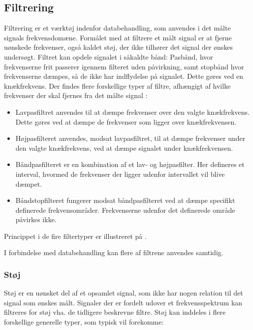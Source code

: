 \subsection{Filtrering}
Filtrering er et værktøj indenfor databehandling, som anvendes i det målte signals frekvensdomæne. Formålet med at filtrere et målt signal er at fjerne uønskede frekvenser, også kaldet støj, der ikke tilhører det signal der ønskes undersøgt. Filtret kan opdele signalet i såkaldte bånd: Pasbånd, hvor frekvenserne frit passerer igennem filteret uden påvirkning, samt stopbånd hvor frekvenserne dæmpes, så de ikke har indflydelse på signalet. Dette gøres ved en knækfrekvens.
Der findes flere forskellige typer af filtre, afhængigt af hvilke frekvenser der skal fjernes fra det målte signal \cite{Devasahayam2000}:

\begin{itemize}
	\item Lavpasfiltret anvendes til at dæmpe frekvenser over den valgte knækfrekvens. Dette gøres ved at dæmpe de frekvenser som ligger over knækfrekvensen.
	\item Højpasfilteret anvendes, modsat lavpasfiltret, til at dæmpe frekvenser under den valgte knækfrekvens, ved at dæmpe signalet under knækfrekvensen.
	\item Båndpasfilteret er en kombination af et lav- og højpasfilter.  Her defineres et interval, hvormed de frekvenser der ligger udenfor intervallet vil blive dæmpet.
	\item Båndstopfilteret fungerer modsat båndpasfilteret ved at dæmpe specifikt definerede frekvensområder. Frekvenserne udenfor det definerede område påvirkes ikke. 
\end{itemize}
  
Princippet i de fire filtertyper er illustreret på .

I forbindelse med databehandling kan flere af filtrene anvendes samtidig. \cite{Devasahayam2000}

\subsubsection{Støj}
Støj er en uønsket del af et opsamlet signal, som ikke har nogen relation til det signal som ønskes målt. Signaler der er fordelt udover et frekvensspektrum kan filtreres for støj vha. de tidligere beskrevne filtre. \cite{Devasahayam2000}
Støj kan inddeles i flere forskellige generelle typer, som typisk vil forekomme:

